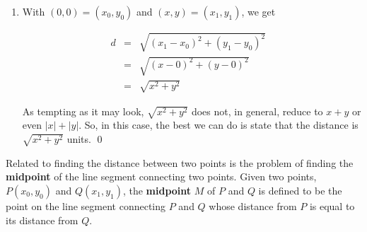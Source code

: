 \documentclass{ximera}
\begin{document}
\begin{example}
\begin{enumerate}
\setlength{\extrarowheight}{2pt}

 

So the distance is $4\sqrt{3}$ units.

\item With $(0, 0) =  \left(x_0, y_0\right)$ and  $(x,y) = \left(x_1, y_1\right)$, we get

\setlength{\extrarowheight}{3pt}

\[ \begin{array}{rclr}

 d & = & \sqrt{\left(x_1 - x_0 \right)^2 + \left(y_1 - y_0 \right)^2} & \\
   & = & \sqrt{ \left(x- 0\right)^2 + \left(y - 0\right)^2} & \\
   & = & \sqrt{x^2+y^2} & \end{array} \]

\setlength{\extrarowheight}{2pt}

 

As tempting as it may look, $\sqrt{x^2+y^2}$ does not, in general, reduce to $x + y$ or even $|x| + |y|$.  So, in this case, the best we can do is state that the distance is $\sqrt{x^2+y^2}$ units. \qed


\end{enumerate} 

\end{example}

Related to finding the distance between two points is the problem of finding the  \textbf{midpoint} of the line segment connecting two points.  Given two points, $P\left(x_0, y_0\right)$ and $Q\left(x_1, y_1\right)$, the \textbf{midpoint} $M$  of $P$ and $Q$ is defined to be the point on the line segment connecting $P$ and $Q$ whose distance from $P$ is equal to its distance from  $Q$.  

\begin{center}
\end{center}
\end{document}
